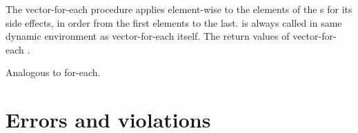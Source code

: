 \begin{entry}{%
}

The {\cf vector-for-each} procedure applies 
element-wise to the elements of the
s for its side effects,  in order from the first elements to the
last.
 is always called in same dynamic environment 
as {\cf vector-for-each} itself.
The return values of {\cf vector-for-each} \areunspecified.

Analogous to {\cf for-each}.
\end{entry}

\section{Errors and violations}
\label{errorviolation}

